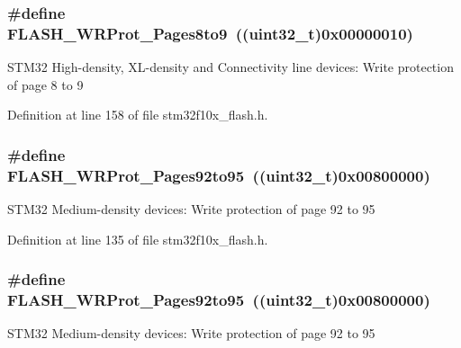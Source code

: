 \subsubsection[{\texorpdfstring{F\+L\+A\+S\+H\+\_\+\+W\+R\+Prot\+\_\+\+Pages8to9}{FLASH_WRProt_Pages8to9}}]{\setlength{\rightskip}{0pt plus 5cm}\#define F\+L\+A\+S\+H\+\_\+\+W\+R\+Prot\+\_\+\+Pages8to9~(({\bf uint32\+\_\+t})0x00000010)}\hypertarget{group___option___bytes___write___protection_ga72f231c0fe953f3cd43cf421c2626f90}{}\label{group___option___bytes___write___protection_ga72f231c0fe953f3cd43cf421c2626f90}
S\+T\+M32 High-\/density, X\+L-\/density and Connectivity line devices\+: Write protection of page 8 to 9 

Definition at line 158 of file stm32f10x\+\_\+flash.\+h.

\subsubsection[{\texorpdfstring{F\+L\+A\+S\+H\+\_\+\+W\+R\+Prot\+\_\+\+Pages92to95}{FLASH_WRProt_Pages92to95}}]{\setlength{\rightskip}{0pt plus 5cm}\#define F\+L\+A\+S\+H\+\_\+\+W\+R\+Prot\+\_\+\+Pages92to95~(({\bf uint32\+\_\+t})0x00800000)}\hypertarget{group___option___bytes___write___protection_gab7d95c1f574523ef827bafd01a64b0bb}{}\label{group___option___bytes___write___protection_gab7d95c1f574523ef827bafd01a64b0bb}
S\+T\+M32 Medium-\/density devices\+: Write protection of page 92 to 95 

Definition at line 135 of file stm32f10x\+\_\+flash.\+h.

\subsubsection[{\texorpdfstring{F\+L\+A\+S\+H\+\_\+\+W\+R\+Prot\+\_\+\+Pages92to95}{FLASH_WRProt_Pages92to95}}]{\setlength{\rightskip}{0pt plus 5cm}\#define F\+L\+A\+S\+H\+\_\+\+W\+R\+Prot\+\_\+\+Pages92to95~(({\bf uint32\+\_\+t})0x00800000)}\hypertarget{group___option___bytes___write___protection_gab7d95c1f574523ef827bafd01a64b0bb}{}\label{group___option___bytes___write___protection_gab7d95c1f574523ef827bafd01a64b0bb}
S\+T\+M32 Medium-\/density devices\+: Write protection of page 92 to 95 

